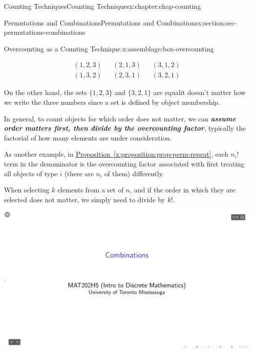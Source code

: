 \documentclass[oneside,10pt,]{book}
\newcommand{\xreffont}{\relax}
\newcommand{\alert}[1]{\textbf{\textit{#1}}}
\numberwithin{equation}{section}
\newlength{\qrsize}
\newlength{\previewwidth}
\newcommand{\amp}{&}
\begin{document}
\begin{chapterptx}{Counting Techniques}{}{Counting Techniques}{}{}{x:chapter:chap-counting}
\begin{sectionptx}{Permutations and Combinations}{}{Permutations and Combinations}{}{}{x:section:sec-permutations-combinations}
\begin{assemblage}{Overcounting as a Counting Technique.}{x:assemblage:box-overcounting}
\par
%
\begin{align*}
(1,2,3) \amp \amp (2,1,3) \amp \amp (3,1,2)\\
(1,3,2) \amp \amp (2,3,1) \amp \amp (3,2,1)
\end{align*}
%
\par
On the other hand, the sets \(\{1,2,3\}\) and \(\{3,2,1\}\) are equal\textemdash{}it doesn't matter how we write the three numbers since a set is defined by object membership.%
\par
In general, to count objects for which order does not matter, we can \alert{assume order matters first, then divide by the overcounting factor}, typically the factorial of how many elements are under consideration.%
\par
As another example, in \hyperref[x:proposition:prop-perm-repeat]{Proposition~{\xreffont\ref{x:proposition:prop-perm-repeat}}}, each \(n_i!\) term in the denominator is the overcounting factor associated with first treating all objects of type \(i\) (there are \(n_i\) of them) differently.%
\end{assemblage}
When selecting \(k\) elements from a set of \(n\), and if the order in which they are selected does not matter, we simply need to divide by \(k!\).%
\begin{sidebyside}{1}{0}{0}{0}%
\begin{sbspanel}{1}%
\setlength{\qrsize}{9em}
\setlength{\previewwidth}{\linewidth}
\addtolength{\previewwidth}{-\qrsize}
\begin{tcbraster}[raster columns=2, raster column skip=1pt, raster halign=center, raster force size=false, raster left skip=0pt, raster right skip=0pt]%
\begin{tcolorbox}[previewstyle, width=\previewwidth]%
\includegraphics[width=0.80\linewidth,height=\qrsize,keepaspectratio]{images/06-thumb.png}%
\end{tcolorbox}%
\begin{tcolorbox}[qrstyle]%

\end{tcolorbox}
\end{tcbraster}
\end{sbspanel}
\end{sidebyside}
\end{sectionptx}
\end{chapterptx}
\end{document}
